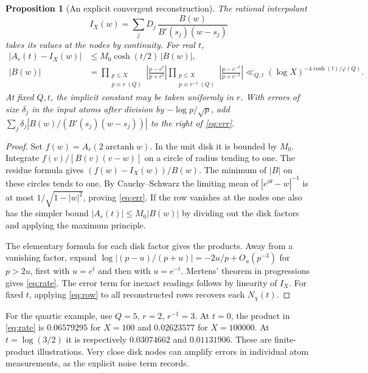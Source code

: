 \documentclass[11pt]{article}
\newtheorem{proposition}[theorem]{Proposition}
\newcommand{\abs}[1]{\left|#1\right|}
\begin{document}
\begin{proposition}[An explicit convergent reconstruction]\label{pr:decode}
The rational interpolant
\[
       I_X(w)=\sum_j D_j\,\frac{B(w)}{B'(s_j)(w-s_j)}
\]
takes its values at the nodes by continuity. For real \(t\),
\begin{align}
 \abs{A_r(t)-I_X(w)}
   &\le M_0\cosh(t/2)\,\abs{B(w)},                                      \label{eq:err}\\
 |B(w)|&=
 \prod_{\substack{p\le X\\p\equiv r\ (Q)}}\left|\frac{p-e^t}{p+e^t}\right|
 \prod_{\substack{p\le X\\p\equiv r^{-1}\ (Q)}}\left|\frac{p-e^{-t}}{p+e^{-t}}\right|
 \ll_{Q,t} (\log X)^{-4\cosh(t)/\varphi(Q)} .                           \label{eq:rate}
\end{align}
At fixed \(Q,t\), the implicit constant may be taken uniformly in \(r\). With errors of size \(\delta_j\) in the input atoms \emph{after} division by \(-\log p/\sqrt p\), add
\(\sum_j\delta_j|B(w)/(B'(s_j)(w-s_j))|\) to the right of \eqref{eq:err}.
\end{proposition}
\begin{proof}
Set \(f(w)=A_r(2\operatorname{arctanh}w)\). In the unit disk it is bounded by \(M_0\). Integrate \(f(v)/[B(v)(v-w)]\) on a circle of radius tending to one. The residue formula gives \((f(w)-I_X(w))/B(w)\). The minimum of \(|B|\) on these circles tends to one. By Cauchy--Schwarz the limiting mean of \(|e^{i\theta}-w|^{-1}\) is at most \(1/\sqrt{1-|w|^2}\), proving \eqref{eq:err}. If the row vanishes at the nodes one also has the simpler bound \(|A_r(t)|\le M_0 |B(w)|\) by dividing out the disk factors and applying the maximum principle.

The elementary formula for each disk factor gives the products. Away from a vanishing factor, expand \(\log|(p-u)/(p+u)|=-2u/p+O_u(p^{-3})\) for \(p>2u\), first with \(u=e^t\) and then with \(u=e^{-t}\). Mertens' theorem in progressions \cite{mertens} gives \eqref{eq:rate}. The error term for inexact readings follows by linearity of \(I_X\). For fixed \(t\), applying \eqref{eq:row} to all reconstructed rows recovers each \(N_\chi(t)\).
\end{proof}

For the quartic example, use \(Q=5\), \(r=2\), \(r^{-1}=3\). At \(t=0\), the product in \eqref{eq:rate} is \(0.06579295\) for \(X=100\) and \(0.02623577\) for \(X=100000\). At \(t=\log(3/2)\) it is respectively \(0.03074662\) and \(0.01131906\). These are finite-product illustrations. Very close disk nodes can amplify errors in individual atom measurements, as the explicit noise term records.
\end{document}
